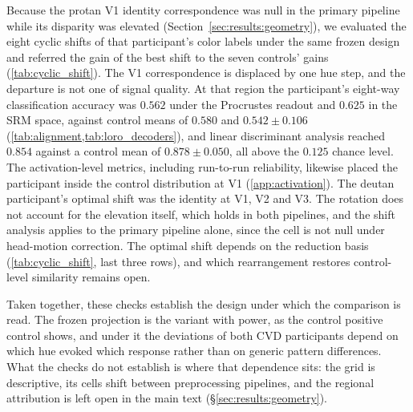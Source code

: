 Because the protan V1 identity correspondence was null in the primary pipeline while its disparity was elevated (Section~\ref{sec:results:geometry}), we evaluated the eight cyclic shifts of that participant's color labels under the same frozen design and referred the gain of the best shift to the seven controls' gains (\cref{tab:cyclic_shift}). The V1 correspondence is displaced by one hue step, and the departure is not one of signal quality. At that region the participant's eight-way classification accuracy was $0.562$ under the Procrustes readout and $0.625$ in the SRM space, against control means of $0.580$ and $0.542 \pm 0.106$ (\cref{tab:alignment,tab:loro_decoders}), and linear discriminant analysis reached $0.854$ against a control mean of $0.878 \pm 0.050$, all above the $0.125$ chance level. The activation-level metrics, including run-to-run reliability, likewise placed the participant inside the control distribution at V1 (\cref{app:activation}).
The deutan participant's optimal shift was the identity at V1, V2 and V3. The rotation does not account for the elevation itself, which holds in both pipelines, and the shift analysis applies to the primary pipeline alone, since the cell is not null under head-motion correction. The optimal shift depends on the reduction basis (\cref{tab:cyclic_shift}, last three rows), and which rearrangement restores control-level similarity remains open.

Taken together, these checks establish the design under which the comparison is read. The frozen projection is the variant with power, as the control positive control shows, and under it the deviations of both CVD participants depend on which hue evoked which response rather than on generic pattern differences. What the checks do not establish is where that dependence sits: the grid is descriptive, its cells shift between preprocessing pipelines, and the regional attribution is left open in the main text (\S\ref{sec:results:geometry}).

